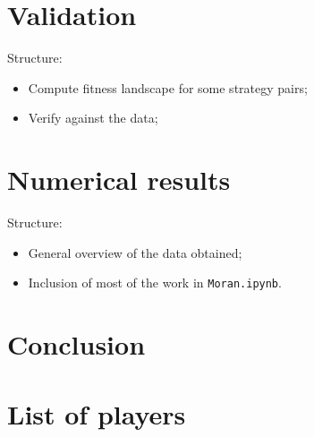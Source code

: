 \documentclass{article}
\begin{document}
\section{Validation}\label{sec:validation}

Structure:

\begin{itemize}
    \item Compute fitness landscape for some strategy pairs;
    \item Verify against the data;
\end{itemize}

\section{Numerical results}\label{sec:numerical_results}

Structure:

\begin{itemize}
    \item General overview of the data obtained;
    \item Inclusion of most of the work in \texttt{Moran.ipynb}.
\end{itemize}

\section{Conclusion}\label{sec:conclusion}

\printbibliography

\appendix

\section{List of players}\label{app:list_of_players}

\begin{multicols}{3}
	\begin{enumerate}
		
	\end{enumerate}
\end{multicols}
\end{document}
